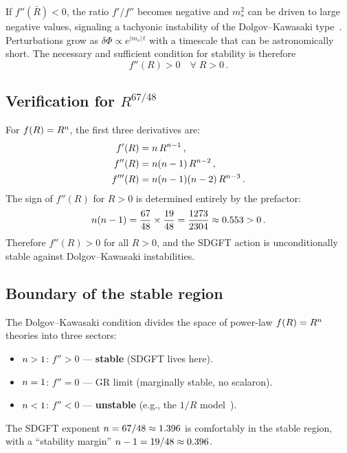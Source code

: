 \documentclass[amsmath,amssymb,aps,prd,twocolumn,superscriptaddress,nofootinbib]{revtex4-2}
\begin{document}
If $f''(\bar{R}) < 0$, the ratio $f'/f''$ becomes negative and
$m_s^2$ can be driven to large negative values, signaling a
tachyonic instability of the Dolgov--Kawasaki
type~\cite{Dolgov2003}.  Perturbations grow as $\delta\Phi \propto
e^{|m_s|\,t}$ with a timescale that can be astronomically short.
The necessary and sufficient condition for stability is therefore
\begin{equation}
  \boxed{f''(R) > 0 \quad \forall\; R > 0\,.}
  \label{eq:DK}
\end{equation}

\subsection{Verification for $R^{67/48}$}

For $f(R) = R^{n}$, the first three derivatives are:
\begin{align}
  f'(R)   &= n\,R^{n-1}\,,
  \label{eq:fp} \\
  f''(R)  &= n(n-1)\,R^{n-2}\,,
  \label{eq:fpp_full} \\
  f'''(R) &= n(n-1)(n-2)\,R^{n-3}\,.
  \label{eq:fppp}
\end{align}
The sign of $f''(R)$ for $R > 0$ is determined entirely by the
prefactor:
\begin{equation}
  n(n-1) = \frac{67}{48} \times \frac{19}{48}
               = \frac{1273}{2304} \approx 0.553 > 0\,.
  \label{eq:DK_prefactor}
\end{equation}
Therefore $f''(R) > 0$ for all $R > 0$, and the SDGFT action is
unconditionally stable against Dolgov--Kawasaki instabilities.

\subsection{Boundary of the stable region}

The Dolgov--Kawasaki condition divides the space of power-law
$f(R) = R^{n}$ theories into three sectors:
\begin{itemize}
  \item $n > 1$: $f'' > 0$ --- \textbf{stable} (SDGFT lives
    here).
  \item $n = 1$: $f'' = 0$ --- GR limit (marginally stable,
    no scalaron).
  \item $n < 1$: $f'' < 0$ --- \textbf{unstable}
    (e.g., the $1/R$ model~\cite{Carroll2004}).
\end{itemize}
The SDGFT exponent $n = 67/48 \approx 1.396$ is comfortably in
the stable region, with a ``stability margin''
$n - 1 = 19/48 \approx 0.396$.
\end{document}
